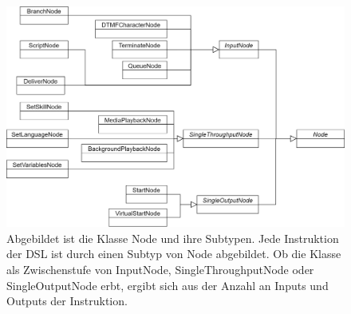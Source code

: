 \begin{figure} %
	\centering
		\includegraphics[width=\textwidth]{img/NodeHierarchy.png}
	\caption[Klassenhierarchie der Klasse Node]{Abgebildet ist die Klasse Node und ihre Subtypen. Jede Instruktion der DSL ist durch einen Subtyp von Node abgebildet. Ob die Klasse als Zwischenstufe von InputNode, SingleThroughputNode oder SingleOutputNode erbt, ergibt sich aus der Anzahl an Inputs und Outputs der Instruktion.}
	\label{fig:UML:Node-Hierarchy}
\end{figure}

